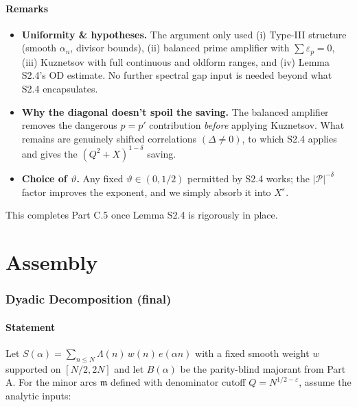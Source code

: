 \documentclass[11pt]{article}
\theoremstyle{definition}
\theoremstyle{remark}
\numberwithin{equation}{part}
\begin{document}
\subsection{Remarks}

\begin{itemize}
	\item \textbf{Uniformity \& hypotheses.} The argument only used (i) Type-III structure (smooth $\alpha_n$, divisor bounds), (ii) balanced prime amplifier with $\sum \varepsilon_p=0$, (iii) Kuznetsov with full continuous and oldform ranges, and (iv) Lemma S2.4’s OD estimate. No further spectral gap input is needed beyond what S2.4 encapsulates.

	\item \textbf{Why the diagonal doesn’t spoil the saving.} The balanced amplifier removes the dangerous $p=p'$ contribution \emph{before} applying Kuznetsov. What remains are genuinely shifted correlations $(\Delta\neq 0)$, to which S2.4 applies and gives the $(Q^2+X)^{1-\delta}$ saving.

	\item \textbf{Choice of $\vartheta$.} Any fixed $\vartheta\in(0,1/2)$ permitted by S2.4 works; the $|\mathcal P|^{-\delta}$ factor improves the exponent, and we simply absorb it into $X^{\varepsilon}$.
\end{itemize}

This completes Part C.5 once Lemma S2.4 is rigorously in place.

\part{Assembly}
\section{Dyadic Decomposition (final)}

\subsection{Statement}

Let $S(\alpha)=\sum_{n\le N}\Lambda(n)\,w(n)\,e(\alpha n)$ with a fixed smooth weight $w$ supported on $[N/2,2N]$ and let $B(\alpha)$ be the parity-blind majorant from Part A. For the minor arcs $\mathfrak m$ defined with denominator cutoff $Q=N^{1/2-\varepsilon}$, assume the analytic inputs:
\end{document}
